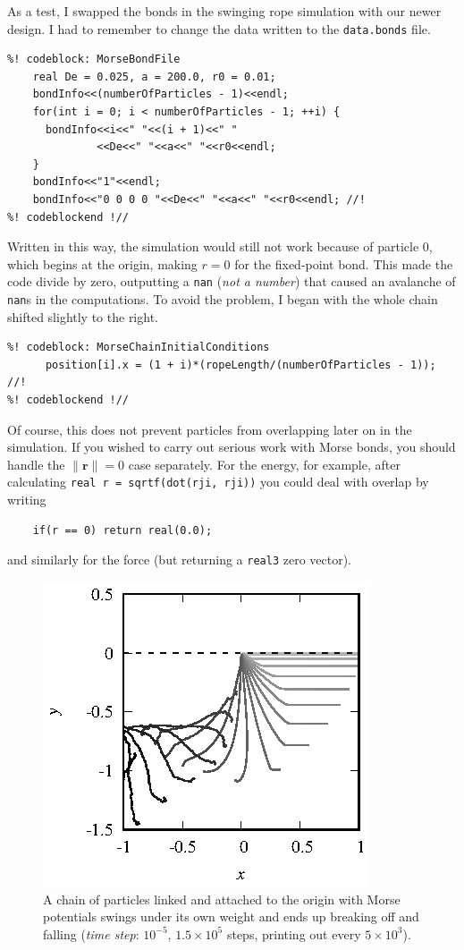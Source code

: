 As a test, I swapped the bonds in the swinging rope simulation with our newer 
design. I had to remember to change the data written to the \texttt{data.bonds} 
file.
\begin{lstlisting}
%! codeblock: MorseBondFile
    real De = 0.025, a = 200.0, r0 = 0.01;
    bondInfo<<(numberOfParticles - 1)<<endl;
    for(int i = 0; i < numberOfParticles - 1; ++i) {
      bondInfo<<i<<" "<<(i + 1)<<" "
              <<De<<" "<<a<<" "<<r0<<endl;
    }
    bondInfo<<"1"<<endl;
    bondInfo<<"0 0 0 0 "<<De<<" "<<a<<" "<<r0<<endl; //!
%! codeblockend !//
\end{lstlisting}
Written in this way, the simulation would still not work because of particle 
$0$, which begins at the origin, making $r = 0$ for the fixed-point bond. This
made the code divide by zero, outputting a \texttt{nan} (\textit{not a number})
that caused an avalanche of \texttt{nan}s in the computations. To avoid the
problem, I began with the whole chain shifted slightly to the right.
\begin{lstlisting}
%! codeblock: MorseChainInitialConditions
      position[i].x = (1 + i)*(ropeLength/(numberOfParticles - 1)); //!
%! codeblockend !//
\end{lstlisting}
Of course, this does not prevent particles from overlapping later on in the 
simulation. If you wished to carry out serious work with Morse bonds, you should 
handle the $\|\mathbf{r}\| = 0$ case separately. For the energy, for example, 
after calculating \texttt{real r = sqrtf(dot(rji, rji))} you could deal with
overlap by writing
\begin{lstlisting}
    if(r == 0) return real(0.0);
\end{lstlisting}
and similarly for the force (but returning a \texttt{real3} zero vector).

\begin{figure}
  \centering
  \includegraphics[width = 0.6 \textwidth]{figures/MorseChain.eps}
  \caption{\label{MorseChain} A chain of particles linked and attached to the 
           origin with Morse potentials swings under its own weight and ends up 
           breaking off and falling (\textit{time step}: $10^{-5}$, 
           $1.5 \times 10^5$ steps, printing out every $5 \times 10^3$).}
\end{figure}


